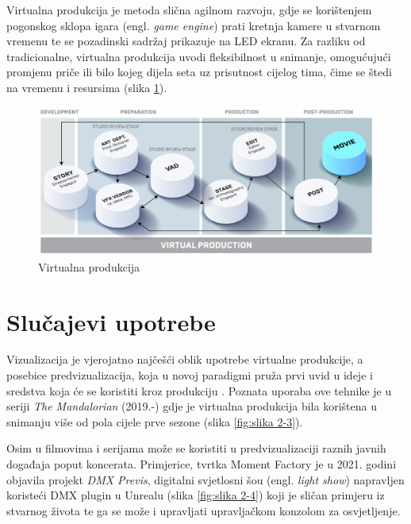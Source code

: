 \documentclass[times, utf8, zavrsni, numeric]{fer}
\begin{document}
Virtualna produkcija je metoda slična agilnom razvoju, gdje se korištenjem pogonskog sklopa igara (engl. \emph{game engine}) prati kretnja kamere u stvarnom vremenu te se pozadinski sadržaj prikazuje na LED ekranu. Za razliku od tradicionalne, virtualna produkcija uvodi fleksibilnost u snimanje, omogućujući promjenu priče ili bilo kojeg dijela seta uz prisutnost cijelog tima, čime se štedi na vremenu i resursima (slika \ref{fig:slika 2-2}).

\pagebreak

\begin{figure}[htp]
	\centering
	\includegraphics[width=\linewidth]{slika 2-2.png}
	\caption{Virtualna produkcija \cite{vpguide1}}
	\label{fig:slika 2-2}
\end{figure}

\section{Slučajevi upotrebe}
Vizualizacija je vjerojatno najčešći oblik upotrebe virtualne produkcije, a posebice predvizualizacija, koja u novoj paradigmi pruža prvi uvid u ideje i sredstva koja će se koristiti kroz produkciju \cite{vpguide2}. Poznata uporaba ove tehnike je u seriji \emph{The Mandalorian} (2019.-) gdje je virtualna produkcija bila korištena u snimanju više od pola cijele prve sezone (slika \ref{fig:slika 2-3}).\newline

Osim u filmovima i serijama može se koristiti u predvizualizaciji raznih javnih događaja poput koncerata. Primjerice, tvrtka Moment Factory je u 2021. godini objavila projekt \emph{DMX Previs}, digitalni svjetlosni šou (engl. \emph{light show}) napravljen koristeći DMX plugin u Unrealu (slika \ref{fig:slika 2-4}) koji je sličan primjeru iz stvarnog života te ga se može i upravljati upravljačkom konzolom za osvjetljenje.\newline
\end{document}
